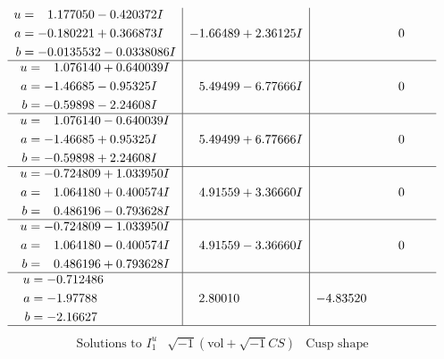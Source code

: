 \documentclass[1p]{elsarticle_modified}
\theoremstyle{definition}
\newcommand{\I}{\sqrt{-1}}
\begin{document}
$$\begin{array}{c|c|c}
\begin{aligned}
u &= \phantom{-}1.177050 - 0.420372 I \\
a &= -0.180221 + 0.366873 I \\
b &= -0.0135532 - 0.0338086 I\end{aligned}
 & -1.66489 + 2.36125 I & \phantom{-0.000000 } 0 \\ \hline\begin{aligned}
u &= \phantom{-}1.076140 + 0.640039 I \\
a &= -1.46685 - 0.95325 I \\
b &= -0.59898 - 2.24608 I\end{aligned}
 & \phantom{-}5.49499 - 6.77666 I & \phantom{-0.000000 } 0 \\ \hline\begin{aligned}
u &= \phantom{-}1.076140 - 0.640039 I \\
a &= -1.46685 + 0.95325 I \\
b &= -0.59898 + 2.24608 I\end{aligned}
 & \phantom{-}5.49499 + 6.77666 I & \phantom{-0.000000 } 0 \\ \hline\begin{aligned}
u &= -0.724809 + 1.033950 I \\
a &= \phantom{-}1.064180 + 0.400574 I \\
b &= \phantom{-}0.486196 - 0.793628 I\end{aligned}
 & \phantom{-}4.91559 + 3.36660 I & \phantom{-0.000000 } 0 \\ \hline\begin{aligned}
u &= -0.724809 - 1.033950 I \\
a &= \phantom{-}1.064180 - 0.400574 I \\
b &= \phantom{-}0.486196 + 0.793628 I\end{aligned}
 & \phantom{-}4.91559 - 3.36660 I & \phantom{-0.000000 } 0 \\ \hline\begin{aligned}
u &= -0.712486\phantom{ +0.000000I} \\
a &= -1.97788\phantom{ +0.000000I} \\
b &= -2.16627\phantom{ +0.000000I}\end{aligned}
 & \phantom{-}2.80010\phantom{ +0.000000I} & -4.83520\phantom{ +0.000000I}\\
 \hline 
 \end{array}$$\newpage$$\begin{array}{c|c|c}  
\text{Solutions to }I^u_{1}& \I (\text{vol} + \sqrt{-1}CS) & \text{Cusp shape}\\

\end{array}$$
\end{document}
